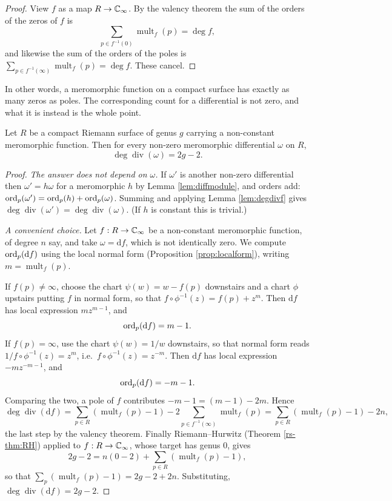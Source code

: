\documentclass[a4paper]{scrartcl}
\newcommand{\Cinf}{\C_\infty}
\newcommand{\mult}{\operatorname{mult}}
\newcommand{\Div}{\operatorname{div}}
\begin{document}
\begin{proof}
	View $f$ as a map $R \to \Cinf$. By the valency theorem the sum of the orders of the
	zeros of $f$ is
	$$
	\sum_{p \in f^{-1}(0)}\mult_f(p) = \deg f,
	$$
	and likewise the sum of the orders of the poles is
	$\sum_{p\in f^{-1}(\infty)}\mult_f(p) = \deg f$. These cancel.
\end{proof}

In other words, a meromorphic function on a compact surface has exactly as many zeros as
poles. The corresponding count for a differential is not zero, and what it is instead is
the whole point.

\begin{theorem}\label{thm:canonicaldegree}
	Let $R$ be a compact Riemann surface of genus $g$ carrying a non-constant meromorphic
	function. Then for every non-zero meromorphic differential $\omega$ on $R$,
	$$
	\deg\Div(\omega) = 2g - 2.
	$$
\end{theorem}

\begin{proof}
	\emph{The answer does not depend on $\omega$.} If $\omega'$ is another non-zero
	differential then $\omega' = h\omega$ for a meromorphic $h$ by Lemma
	\ref{lem:diffmodule}, and orders add: $\operatorname{ord}_p(\omega') = \operatorname{ord}_p(h) + \operatorname{ord}_p(\omega)$.
	Summing and applying Lemma \ref{lem:degdivf} gives
	$\deg\Div(\omega') = \deg\Div(\omega)$. (If $h$ is constant this is trivial.)

	\emph{A convenient choice.} Let $f : R \to \Cinf$ be a non-constant meromorphic
	function, of degree $n$ say, and take $\omega = \mathrm{d}f$, which is not identically zero.
	We compute $\operatorname{ord}_p(\mathrm{d}f)$ using the local normal form (Proposition
	\ref{prop:localform}), writing $m = \mult_f(p)$.

	If $f(p) \neq \infty$, choose the chart $\psi(w) = w - f(p)$ downstairs and a chart
	$\phi$ upstairs putting $f$ in normal form, so that
	$f\circ\phi^{-1}(z) = f(p) + z^m$. Then $\mathrm{d}f$ has local expression $mz^{m-1}$, and
	$$
	\operatorname{ord}_p(\mathrm{d}f) = m - 1.
	$$
	If $f(p) = \infty$, use the chart $\psi(w) = 1/w$ downstairs, so that normal form reads
	$1/f\circ\phi^{-1}(z) = z^m$, i.e.\ $f\circ\phi^{-1}(z) = z^{-m}$. Then $\mathrm{d}f$ has
	local expression $-mz^{-m-1}$, and
	$$
	\operatorname{ord}_p(\mathrm{d}f) = -m-1.
	$$
	Comparing the two, a pole of $f$ contributes $-m-1 = (m-1) - 2m$. Hence
	$$
	\deg\Div(\mathrm{d}f) = \sum_{p\in R}\left(\mult_f(p)-1\right)
	- 2\!\!\sum_{p\in f^{-1}(\infty)}\!\!\mult_f(p)
	= \sum_{p\in R}\left(\mult_f(p)-1\right) - 2n,
	$$
	the last step by the valency theorem. Finally Riemann--Hurwitz (Theorem \ref{rs-thm:RH})
	applied to $f : R \to \Cinf$, whose target has genus $0$, gives
	$$
	2g-2 = n(0 - 2) + \sum_{p\in R}\left(\mult_f(p)-1\right),
	$$
	so that $\sum_p(\mult_f(p)-1) = 2g-2+2n$. Substituting, $\deg\Div(\mathrm{d}f) = 2g-2$.
\end{proof}
\end{document}
